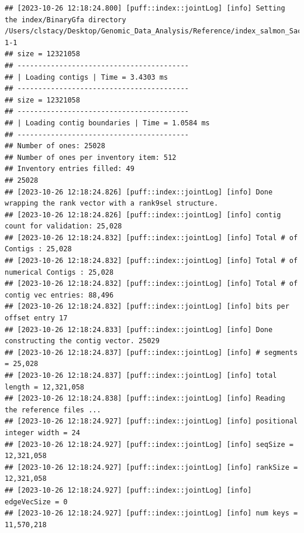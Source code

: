\documentclass[
]{book}
\begin{document}
\begin{verbatim}
## [2023-10-26 12:18:24.800] [puff::index::jointLog] [info] Setting the index/BinaryGfa directory /Users/clstacy/Desktop/Genomic_Data_Analysis/Reference/index_salmon_Saccharomyces_cerevisiae.R64-1-1
## size = 12321058
## -----------------------------------------
## | Loading contigs | Time = 3.4303 ms
## -----------------------------------------
## size = 12321058
## -----------------------------------------
## | Loading contig boundaries | Time = 1.0584 ms
## -----------------------------------------
## Number of ones: 25028
## Number of ones per inventory item: 512
## Inventory entries filled: 49
## 25028
## [2023-10-26 12:18:24.826] [puff::index::jointLog] [info] Done wrapping the rank vector with a rank9sel structure.
## [2023-10-26 12:18:24.826] [puff::index::jointLog] [info] contig count for validation: 25,028
## [2023-10-26 12:18:24.832] [puff::index::jointLog] [info] Total # of Contigs : 25,028
## [2023-10-26 12:18:24.832] [puff::index::jointLog] [info] Total # of numerical Contigs : 25,028
## [2023-10-26 12:18:24.832] [puff::index::jointLog] [info] Total # of contig vec entries: 88,496
## [2023-10-26 12:18:24.832] [puff::index::jointLog] [info] bits per offset entry 17
## [2023-10-26 12:18:24.833] [puff::index::jointLog] [info] Done constructing the contig vector. 25029
## [2023-10-26 12:18:24.837] [puff::index::jointLog] [info] # segments = 25,028
## [2023-10-26 12:18:24.837] [puff::index::jointLog] [info] total length = 12,321,058
## [2023-10-26 12:18:24.838] [puff::index::jointLog] [info] Reading the reference files ...
## [2023-10-26 12:18:24.927] [puff::index::jointLog] [info] positional integer width = 24
## [2023-10-26 12:18:24.927] [puff::index::jointLog] [info] seqSize = 12,321,058
## [2023-10-26 12:18:24.927] [puff::index::jointLog] [info] rankSize = 12,321,058
## [2023-10-26 12:18:24.927] [puff::index::jointLog] [info] edgeVecSize = 0
## [2023-10-26 12:18:24.927] [puff::index::jointLog] [info] num keys = 11,570,218

\end{verbatim}
\end{document}
